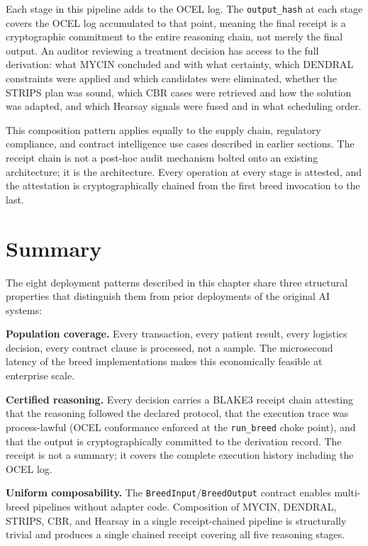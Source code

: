 Each stage in this pipeline adds to the OCEL log. The \texttt{output\_hash} at
each stage covers the OCEL log accumulated to that point, meaning the final
receipt is a cryptographic commitment to the entire reasoning chain, not merely
the final output. An auditor reviewing a treatment decision has access to the
full derivation: what MYCIN concluded and with what certainty, which DENDRAL
constraints were applied and which candidates were eliminated, whether the STRIPS
plan was sound, which CBR cases were retrieved and how the solution was adapted,
and which Hearsay signals were fused and in what scheduling order.

This composition pattern applies equally to the supply chain, regulatory compliance,
and contract intelligence use cases described in earlier sections. The receipt
chain is not a post-hoc audit mechanism bolted onto an existing architecture; it
is the architecture. Every operation at every stage is attested, and the attestation
is cryptographically chained from the first breed invocation to the last.

\section{Summary}
\label{sec:ch5-summary}

The eight deployment patterns described in this chapter share three structural
properties that distinguish them from prior deployments of the original AI systems:

\textbf{Population coverage.} Every transaction, every patient result, every
logistics decision, every contract clause is processed, not a sample. The
microsecond latency of the breed implementations makes this economically feasible
at enterprise scale.

\textbf{Certified reasoning.} Every decision carries a BLAKE3 receipt chain
attesting that the reasoning followed the declared protocol, that the execution
trace was process-lawful (OCEL conformance enforced at the \texttt{run\_breed}
choke point), and that the output is cryptographically committed to the derivation
record. The receipt is not a summary; it covers the complete execution history
including the OCEL log.

\textbf{Uniform composability.} The \texttt{BreedInput}/\texttt{BreedOutput}
contract enables multi-breed pipelines without adapter code. Composition of
MYCIN, DENDRAL, STRIPS, CBR, and Hearsay in a single receipt-chained pipeline
is structurally trivial and produces a single chained receipt covering all five
reasoning stages.

